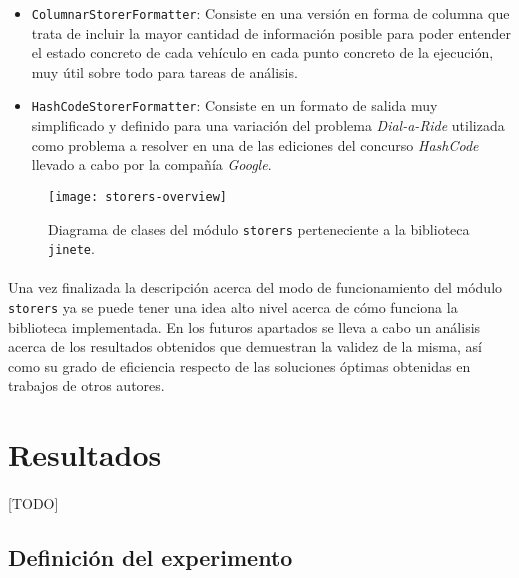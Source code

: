 \documentclass{subfiles}
\begin{document}
          \begin{itemize}
            \item \texttt{ColumnarStorerFormatter}: Consiste en una versión en forma de columna que trata de incluir la mayor cantidad de información posible para poder entender el estado concreto de cada vehículo en cada punto concreto de la ejecución, muy útil sobre todo para tareas de análisis.

            \item \texttt{HashCodeStorerFormatter}: Consiste en un formato de salida muy simplificado y definido para una variación del problema \emph{Dial-a-Ride} utilizada como problema a resolver en una de las ediciones del concurso \emph{HashCode} llevado a cabo por la compañía \emph{Google}.

          \end{itemize}
          
          \begin{figure}[ht]
            \centering
            \texttt{[image: storers-overview]}
            \caption{Diagrama de clases del módulo \texttt{storers} perteneciente a la biblioteca \texttt{jinete}.}
            \label{img:storers_overview}
          \end{figure}

          \paragraph{}
          Una vez finalizada la descripción acerca del modo de funcionamiento del módulo \texttt{storers} ya se puede tener una idea alto nivel acerca de cómo funciona la biblioteca implementada. En los futuros apartados se lleva a cabo un análisis acerca de los resultados obtenidos que demuestran la validez de la misma, así como su grado de eficiencia respecto de las soluciones óptimas obtenidas en trabajos de otros autores.

    \section{Resultados}
    \label{sec:results}

      \paragraph{}
      [TODO]

      \subsection{Definición del experimento}
      \label{sec:results_definition}
\end{document}
